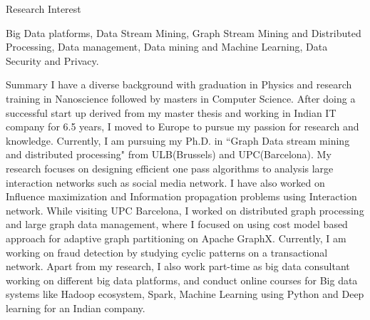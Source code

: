 \documentclass{resume} %
\begin{document}
\begin{rSection}{Research Interest}

Big Data platforms, Data Stream Mining, Graph Stream Mining and Distributed Processing, Data management, Data mining and Machine Learning, Data Security and Privacy.

\end{rSection}
\begin{rSection}{Summary}
I have a diverse background with graduation in Physics and research training in Nanoscience followed by masters in Computer Science. After doing a successful start up derived from my master thesis and working in Indian IT company for 6.5 years, I moved to Europe to pursue my passion for research and knowledge. Currently, I am pursuing my Ph.D. in ``Graph Data stream mining and distributed processing" from ULB(Brussels) and UPC(Barcelona). My research focuses on designing efficient one pass algorithms to analysis large interaction networks such as social media network. I have also worked on Influence maximization and Information propagation problems using Interaction network. While visiting UPC Barcelona, I worked on distributed graph processing and large graph data management, where I focused on using cost model based approach for adaptive graph partitioning on Apache GraphX. Currently, I am working on fraud detection by studying cyclic patterns on a transactional network. Apart from my research, I also work part-time as big data consultant working on different big data platforms, and conduct online courses for Big data systems like Hadoop ecosystem, Spark, Machine Learning using Python and Deep learning for an Indian company. 
\end{rSection}
\end{document}

